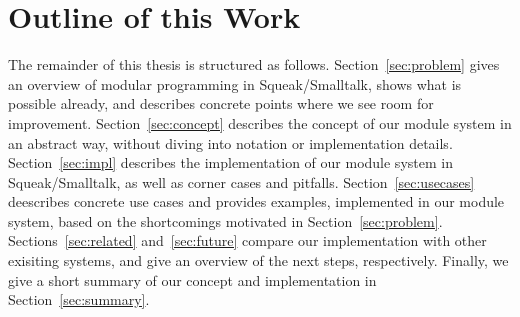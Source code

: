 \section{Outline of this Work}
The remainder of this thesis is structured as follows. Section~\ref{sec:problem} gives an overview of modular programming in Squeak/Smalltalk, shows what is possible already, and describes concrete points where we see room for improvement. Section~\ref{sec:concept} describes the concept of our module system in an abstract way, without diving into notation or implementation details. Section~\ref{sec:impl} describes the implementation of our module system in Squeak/Smalltalk, as well as corner cases and pitfalls. Section~\ref{sec:usecases} deescribes concrete use cases and provides examples, implemented in our module system, based on the shortcomings motivated in Section~\ref{sec:problem}. Sections~\ref{sec:related} and~\ref{sec:future} compare our implementation with other exisiting systems, and give an overview of the next steps, respectively. Finally, we give a short summary of our concept and implementation in Section~\ref{sec:summary}.
